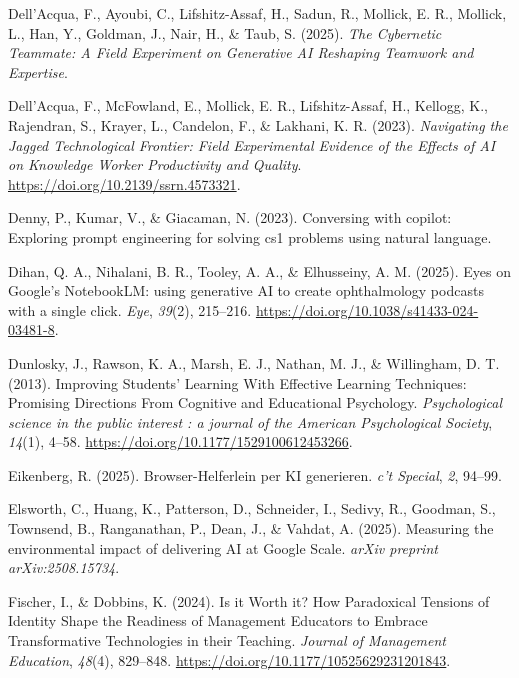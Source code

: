 \documentclass[
  ngerman,
  letterpaper,
  DIV=11]{scrreprt}
\newlength{\cslhangindent}
\newenvironment{CSLReferences}[2] %
 {\begin{list}{}{%
  \setlength{\itemindent}{0pt}
  \setlength{\leftmargin}{0pt}
  \setlength{\parsep}{0pt}
  \ifodd #1
   \setlength{\leftmargin}{\cslhangindent}
   \setlength{\itemindent}{-1\cslhangindent}
  \fi
  \setlength{\itemsep}{#2\baselineskip}}}
 {\end{list}}
\begin{document}
\begin{CSLReferences}{1}{0}
Dell'Acqua, F., Ayoubi, C., Lifshitz-Assaf, H., Sadun, R., Mollick, E.
R., Mollick, L., Han, Y., Goldman, J., Nair, H., \& Taub, S. (2025).
\emph{The Cybernetic Teammate: A Field Experiment on Generative AI
Reshaping Teamwork and Expertise}.

Dell'Acqua, F., McFowland, E., Mollick, E. R., Lifshitz-Assaf, H.,
Kellogg, K., Rajendran, S., Krayer, L., Candelon, F., \& Lakhani, K. R.
(2023). \emph{Navigating the Jagged Technological Frontier: Field
Experimental Evidence of the Effects of AI on Knowledge Worker
Productivity and Quality}. \url{https://doi.org/10.2139/ssrn.4573321}.

Denny, P., Kumar, V., \& Giacaman, N. (2023). Conversing with copilot:
Exploring prompt engineering for solving cs1 problems using natural
language.

Dihan, Q. A., Nihalani, B. R., Tooley, A. A., \& Elhusseiny, A. M.
(2025). Eyes on Google's NotebookLM: using generative AI to create
ophthalmology podcasts with a single click. \emph{Eye}, \emph{39}(2),
215--216. \url{https://doi.org/10.1038/s41433-024-03481-8}.

Dunlosky, J., Rawson, K. A., Marsh, E. J., Nathan, M. J., \& Willingham,
D. T. (2013). Improving Students' Learning With Effective Learning
Techniques: Promising Directions From Cognitive and Educational
Psychology. \emph{Psychological science in the public interest : a
journal of the American Psychological Society}, \emph{14}(1), 4--58.
\url{https://doi.org/10.1177/1529100612453266}.

Eikenberg, R. (2025). Browser-Helferlein per KI generieren. \emph{c't
Special}, \emph{2}, 94--99.

Elsworth, C., Huang, K., Patterson, D., Schneider, I., Sedivy, R.,
Goodman, S., Townsend, B., Ranganathan, P., Dean, J., \& Vahdat, A.
(2025). Measuring the environmental impact of delivering AI at Google
Scale. \emph{arXiv preprint arXiv:2508.15734}.

Fischer, I., \& Dobbins, K. (2024). Is it Worth it? How Paradoxical
Tensions of Identity Shape the Readiness of Management Educators to
Embrace Transformative Technologies in their Teaching. \emph{Journal of
Management Education}, \emph{48}(4), 829--848.
\url{https://doi.org/10.1177/10525629231201843}.


\end{CSLReferences}
\end{document}
